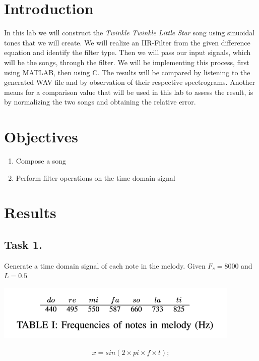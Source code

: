 \documentclass{article}
\begin{document}


\hspace{0pt}
\vfill
\tableofcontents
\vfill
\hspace{0pt}
\newpage
\section{Introduction}
    In this lab we will construct the \textit{Twinkle Twinkle Little Star} song using sinuoidal tones that we will create. We will realize an IIR-Filter from the given difference equation and identify the filter type. Then we will pass our input signals, which will be the songs, through the filter. We will be implementing this process, first using MATLAB, then using C. The results will be compared by listening to the generated WAV file and by observation of their respective spectrograms. Another means for a comparison value that will be used in this lab to assess the result, is by normalizing the two songs and obtaining the relative error.


\section{Objectives}
    \begin{enumerate}
      \item Compose a song
      \item Perform filter operations on the time domain signal
    \end{enumerate}

\section{Results}
    \subsection{Task 1.} Generate a time domain signal of each note in the melody. Given $F_s=8000$ and $L=0.5$
        \begin{center}
            \includegraphics[scale=0.8]{table1.PNG}
        \end{center}
        \begin{align*}
            x=sin(2\times pi\times f\times t);
        \end{align*}
        
\end{document}
